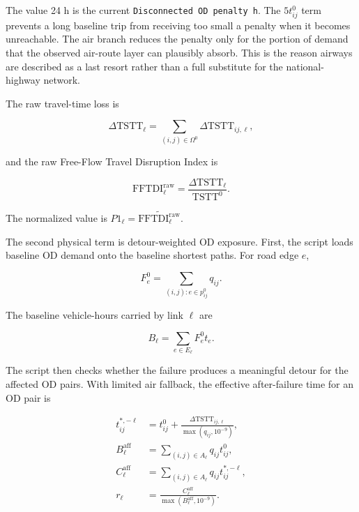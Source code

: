 \documentclass[11pt,a4paper]{article}
\begin{document}
The value 24 h is the current \texttt{Disconnected OD penalty h}. The
$5t^0_{ij}$ term prevents a long baseline trip from receiving too small a
penalty when it becomes unreachable. The air branch reduces the penalty only for
the portion of demand that the observed air-route layer can plausibly absorb.
This is the reason airways are described as a last resort rather than a full
substitute for the national-highway network.

The raw travel-time loss is

\begin{equation}
\Delta \mathrm{TSTT}_{\ell}
=\sum_{(i,j)\in\Omega^0}\Delta \mathrm{TSTT}_{ij,\ell},
\label{eq:mlpi-tstt-loss}
\end{equation}

and the raw Free-Flow Travel Disruption Index is

\begin{equation}
\mathrm{FFTDI}^{\mathrm{raw}}_{\ell}
=\frac{\Delta \mathrm{TSTT}_{\ell}}{\mathrm{TSTT}^0}.
\label{eq:mlpi-fftdi}
\end{equation}

The normalized value is $P1_{\ell}=\widetilde{\mathrm{FFTDI}^{\mathrm{raw}}_{\ell}}$.

The second physical term is detour-weighted OD exposure. First, the script
loads baseline OD demand onto the baseline shortest paths. For road edge $e$,

\begin{equation}
F^0_e=\sum_{(i,j):e\in p^0_{ij}}q_{ij}.
\label{eq:mlpi-edge-flow}
\end{equation}

The baseline vehicle-hours carried by link $\ell$ are

\begin{equation}
B_{\ell}=\sum_{e\in E_{\ell}} F^0_e t_e .
\label{eq:mlpi-baseline-exposure}
\end{equation}

The script then checks whether the failure produces a meaningful detour for
the affected OD pairs. With limited air fallback, the effective after-failure
time for an OD pair is

\begin{align}
t^{*,-\ell}_{ij}
&=t^0_{ij}
 +\frac{\Delta \mathrm{TSTT}_{ij,\ell}}{\max(q_{ij},10^{-9})},\\
B^{\mathrm{aff}}_{\ell}
&=\sum_{(i,j)\in A_{\ell}} q_{ij}t^0_{ij},\\
C^{\mathrm{aff}}_{\ell}
&=\sum_{(i,j)\in A_{\ell}} q_{ij}t^{*,-\ell}_{ij},\\
r_{\ell}
&=\frac{C^{\mathrm{aff}}_{\ell}}
        {\max(B^{\mathrm{aff}}_{\ell},10^{-9})}.
\label{eq:mlpi-detour-ratio}
\end{align}
\end{document}
